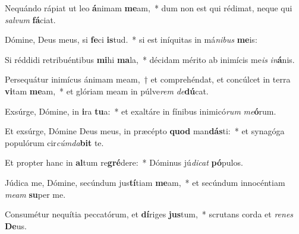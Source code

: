 \item Nequándo rápiat ut leo \textbf{á}nimam \textbf{me}am,~* dum non est qui rédimat, neque qui \textit{sal}\textit{vum} \textbf{fá}ciat.
\item Dómine, Deus meus, si \textbf{fe}ci \textbf{is}tud.~* si est iníquitas in má\textit{ni}\textit{bus} \textbf{me}is:
\item Si réddidi retribuéntibus \textbf{mi}hi \textbf{ma}la,~* décidam mérito ab inimícis me\textit{is} \textit{in}\textbf{á}nis.
\item Persequátur inimícus ánimam meam,~† et comprehéndat, et concúlcet in terra \textbf{vi}tam \textbf{me}am,~* et glóriam meam in púlve\textit{rem} \textit{de}\textbf{dú}cat.
\item Exsúrge, Dómine, in \textbf{i}ra \textbf{tu}a:~* et exaltáre in fínibus inimicó\textit{rum} \textit{me}\textbf{ó}rum.
\item Et exsúrge, Dómine Deus meus, in præcépto \textbf{quod} man\textbf{dás}ti:~* et synagóga populórum cir\textit{cúm}\textit{da}\textbf{bit} te.
\item Et propter hanc in \textbf{al}tum re\textbf{gré}dere:~* Dóminus jú\textit{di}\textit{cat} \textbf{pó}pulos.
\item Júdica me, Dómine, secúndum jus\textbf{tí}tiam \textbf{me}am,~* et secúndum innocéntiam \textit{me}\textit{am} \textbf{su}per me.
\item Consumétur nequítia peccatórum, et \textbf{dí}riges \textbf{jus}tum,~* scrutans corda et \textit{re}\textit{nes} \textbf{De}us.
